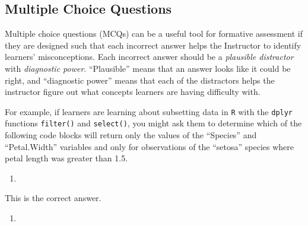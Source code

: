 \documentclass[]{book}
\newenvironment{Shaded}{\begin{snugshade}}{\end{snugshade}}
\newcommand{\FloatTok}[1]{\textcolor[rgb]{0.00,0.00,0.81}{#1}}
\newcommand{\KeywordTok}[1]{\textcolor[rgb]{0.13,0.29,0.53}{\textbf{#1}}}
\newcommand{\NormalTok}[1]{#1}
\newcommand{\OperatorTok}[1]{\textcolor[rgb]{0.81,0.36,0.00}{\textbf{#1}}}
\newcommand{\StringTok}[1]{\textcolor[rgb]{0.31,0.60,0.02}{#1}}
\begin{document}
\hypertarget{multiple-choice-questions}{%
\subsection{Multiple Choice Questions}\label{multiple-choice-questions}}

Multiple choice questions (MCQs) can be a useful tool for formative assessment if they are
designed such that each incorrect answer helps the Instructor to identify learners'
misconceptions. Each incorrect answer should be a \emph{plausible distractor} with \emph{diagnostic power}.
``Plausible'' means that an answer looks like it could be right, and ``diagnostic power'' means
that each of the distractors helps the instructor figure out
what concepts learners are having difficulty with.

For example, if learners are learning about subsetting data in \texttt{R} with the \texttt{dplyr}
functions \texttt{filter()} and \texttt{select()}, you might ask them to determine which of the
following code blocks will return only the values of the ``Species'' and ``Petal.Width'' variables
and only for observations of the ``setosa'' species where petal length
was greater than 1.5.

\begin{enumerate}
\def\labelenumi{\alph{enumi}.}
\item
\end{enumerate}

\begin{Shaded}
\end{Shaded}

This is the correct answer.

\begin{enumerate}
\def\labelenumi{\alph{enumi}.}
\setcounter{enumi}{1}
\item
\end{enumerate}

\begin{Shaded}
\end{Shaded}
\end{document}
